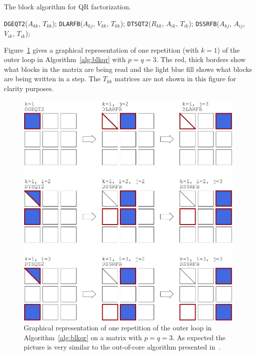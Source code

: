 \documentclass[runningheads]{llncs}
\begin{document}
\begin{algorithm}[!h]
\caption{\label{alg:blkqr}The block algorithm for QR factorization.}
  \begin{algorithmic}[1]
    \STATE \texttt{DGEQT2}($A_{kk}$, $T_{kk}$);
    \STATE \texttt{DLARFB}($A_{kj}$, $V_{kk}$, $T_{kk}$);
    \ENDFOR
    \STATE \texttt{DTSQT2}($R_{kk}$, $A_{ik}$, $T_{ik}$);
    \STATE \texttt{DSSRFB}($A_{kj}$, $A_{ij}$, $V_{ik}$, $T_{ik}$);
    \ENDFOR
    \ENDFOR
    \ENDFOR
  \end{algorithmic}
\end{algorithm}

Figure~\ref{fig:blk_alg} gives a graphical representation of one
repetition (with $k=1$) of the outer loop in Algorithm~\ref{alg:blkqr} with
$p=q=3$. The red, thick borders show what blocks in the matrix are being read
and the light blue fill shows what blocks are being written in a
step. The $T_{kk}$ matrices are not shown in this figure for clarity purposes.

\begin{figure}[!h]
  \begin{center}
    \includegraphics[width=\textwidth]{images/blk_alg_col.pdf}
  \caption{\label{fig:blk_alg}Graphical representation of one
    repetition of the outer loop in Algorithm~\ref{alg:blkqr} on a
    matrix with $p=q=3$. As expected the picture is very similar
    to the out-of-core algorithm presented in~\cite{1055534}.
}
  \end{center}
\end{figure}
\end{document}
